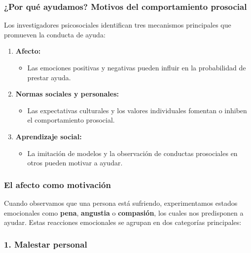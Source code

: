 \documentclass[
]{book}
\providecommand{\tightlist}{%
  \setlength{\itemsep}{0pt}\setlength{\parskip}{0pt}}
\begin{document}
\subsubsection{¿Por qué ayudamos? Motivos del comportamiento prosocial}\label{por-quuxe9-ayudamos-motivos-del-comportamiento-prosocial}

Los investigadores psicosociales identifican tres mecanismos principales que promueven la conducta de ayuda:

\begin{enumerate}
\def\labelenumi{\arabic{enumi}.}
\tightlist
\item
  \textbf{Afecto:}

  \begin{itemize}
  \tightlist
  \item
    Las emociones positivas y negativas pueden influir en la probabilidad de prestar ayuda.
  \end{itemize}
\item
  \textbf{Normas sociales y personales:}

  \begin{itemize}
  \tightlist
  \item
    Las expectativas culturales y los valores individuales fomentan o inhiben el comportamiento prosocial.
  \end{itemize}
\item
  \textbf{Aprendizaje social:}

  \begin{itemize}
  \tightlist
  \item
    La imitación de modelos y la observación de conductas prosociales en otros pueden motivar a ayudar.
  \end{itemize}
\end{enumerate}

\subsubsection{El afecto como motivación}\label{el-afecto-como-motivaciuxf3n}

Cuando observamos que una persona está sufriendo, experimentamos estados emocionales como \textbf{pena}, \textbf{angustia} o \textbf{compasión}, los cuales nos predisponen a ayudar. Estas reacciones emocionales se agrupan en dos categorías principales:

\subsubsection{\texorpdfstring{1. \textbf{Malestar personal}}{1. Malestar personal}}\label{malestar-personal}
\end{document}
